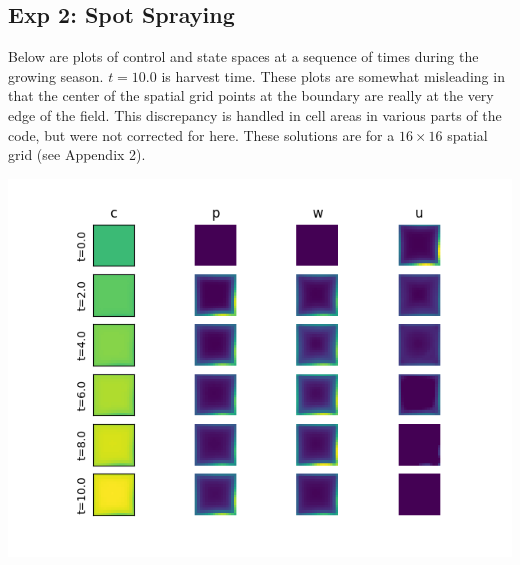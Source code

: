 \documentclass[11pt]{article}
\begin{document}
\subsection{Exp 2: Spot Spraying}

Below are plots of control and state spaces at a sequence of times during the growing season. $t=10.0$ is harvest time. These plots are somewhat misleading in that the center of the spatial grid points at the boundary are really at the very edge of the field. This discrepancy is handled in cell areas in various parts of the code, but were not corrected for here. These solutions are for a $16 \times 16$ spatial grid (see Appendix 2).

\begin{minipage}{\textwidth}
	\begin{center}
		\includegraphics[width=0.8\linewidth]{../resim_240718-033400/slices.png}
		\vspace{5pt}
		\label{fig: appspotslow}
	\end{center}
\end{minipage}
\end{document}
